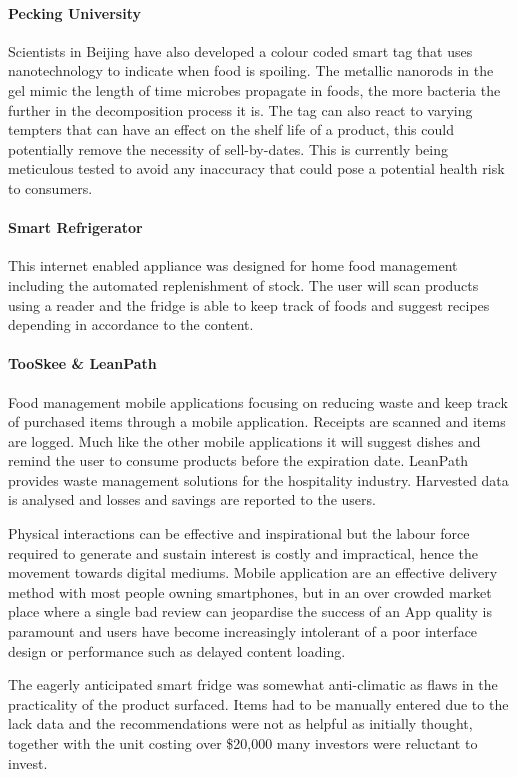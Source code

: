 \documentclass[a4paper, 11pt]{article}
\begin{document}
\paragraph{Pecking University}Scientists in Beijing have also developed a colour coded smart tag that uses nanotechnology to indicate when food is spoiling. The metallic nanorods in the gel mimic the length of time microbes propagate in foods, the more bacteria the further in the decomposition process it is. The tag can also react to varying tempters that can have an effect on the shelf life of a product, this could potentially remove the necessity of sell-by-dates. This is currently being meticulous tested to avoid any inaccuracy that could pose a potential health risk to consumers.
\paragraph{Smart Refrigerator}  This internet enabled appliance was designed for home food management including the automated replenishment of stock. The user will scan products using a reader and the fridge is able to keep track of foods and suggest recipes depending in accordance to the content.

\paragraph{TooSkee \& LeanPath} Food management mobile applications focusing on reducing waste and keep track of purchased items through a mobile application. Receipts are scanned and items are logged. Much like the other mobile applications it will suggest dishes and remind the user to consume products before the expiration date. LeanPath provides waste management solutions for the hospitality industry. Harvested data is analysed and losses and savings are reported to the users.

Physical interactions can be effective and inspirational but the labour force required to generate and sustain interest is costly and impractical, hence the movement towards digital mediums. Mobile application are an effective delivery method with most people owning smartphones, but in an over crowded market place where a single bad review can jeopardise the success of an App quality is paramount and users have become increasingly intolerant of a poor interface design or performance such as delayed content loading.

The eagerly anticipated smart fridge was somewhat anti-climatic as flaws in the practicality of the product surfaced. Items had to be manually entered due to the lack data and the recommendations were not as helpful as initially thought, together with the unit costing over \$20,000 many investors were reluctant to invest.
\end{document}
